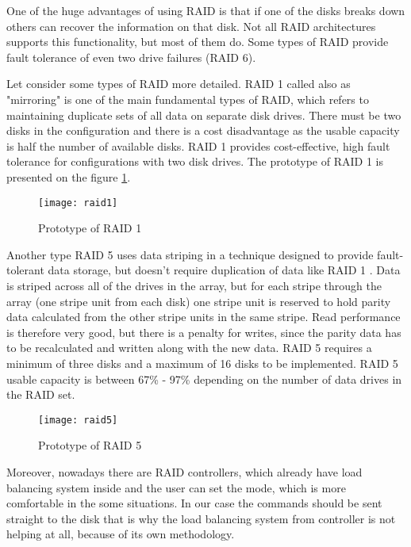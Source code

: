 One of the huge advantages of using RAID is that if one of the disks breaks down others can recover the information on that disk. Not all RAID architectures supports this functionality, but most of them do. Some types of RAID provide fault tolerance of even two drive failures (RAID 6).

Let consider some types of RAID more detailed. RAID 1 called also as "mirroring" is one of the main fundamental types of RAID, which refers to maintaining duplicate sets of all data on separate disk drives. There must be two disks in the configuration and there is a cost disadvantage as the usable
capacity is half the number of available disks. RAID 1 provides cost-effective, high fault tolerance for configurations with two disk drives. The prototype of RAID 1 is presented on the figure \ref{fig:raid1}.
\begin{figure}[h]
\begin{center}
  \texttt{[image: raid1]}
\end{center}
  \caption{Prototype of RAID 1}
  \label{fig:raid1}
\end{figure}

Another type RAID 5 uses data striping in a technique designed to provide fault-tolerant data storage, but doesn't require duplication of data like RAID 1 \cite{raid_overview}. Data is striped across all of the drives in the array, but for each stripe through the array (one stripe unit from each disk) one stripe unit is reserved to hold parity data calculated from the other stripe units in the same stripe. Read performance is therefore very good, but there is a penalty for writes, since the parity data has to be recalculated and written along with the new data. RAID 5 requires a minimum of three disks and a maximum of 16 disks to be implemented. RAID 5 usable capacity is between 67\% - 97\% depending on the number of data drives in the RAID set.
\begin{figure}[h]
\begin{center}
  \texttt{[image: raid5]}
\end{center}
  \caption{Prototype of RAID 5}
  \label{fig:raid5}
\end{figure}



Moreover, nowadays there are RAID controllers, which already have load balancing system inside and the user can set the mode, which is more comfortable in the some situations. In our case the commands should be sent straight to the disk that is why the load balancing system from controller is not helping at all, because of its own methodology.  


